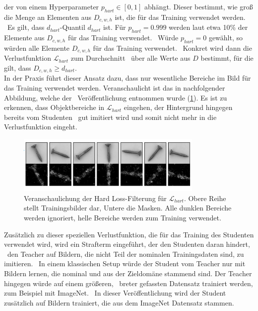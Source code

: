 der von einem Hyperparameter $p_{hart} \in \left[0,1\right]$ abhängt. Dieser bestimmt, wie groß die Menge an Elementen aus $D_{c,w,h}$ ist, die für das Training verwendet werden. \
Es gilt, dass $d_{hart}$-Quantil $d_{hart}$ ist. Für $p_{hart}=\num{0,999}$ werden laut \cite{efficientad} etwa 10\% der Elemente aus $D_{c,w,h}$ für das Training verwendet. \
Würde $p_{hart}=0$ gewählt, so würden alle Elemente $D_{c,w,h}$ für das Training verwendet. \ Konkret wird dann die Verlustfunktion $\mathcal{L}_{hart}$ zum Durchschnitt \
über alle Werte aus $D$ bestimmt, für die gilt, dass $D_{c,w,h} \geq d_{hart}$. \\
In der Praxis führt dieser Ansatz dazu, dass nur wesentliche Bereiche im Bild für das Training verwendet werden. Veranschaulicht ist das in nachfolgender Abbildung, welche der \
Veröffentlichung entnommen wurde (\ref{fig:hardthreshold}). Es ist zu erkennen, dass Objektbereiche in $\mathcal{L}_{hart}$ eingehen, der Hintergrund hingegen bereits vom Studenten \
gut imitiert wird und somit nicht mehr in die Verlustfunktion eingeht. \\
\begin{figure}[h]
    \centering
    \includegraphics[width=0.8\textwidth]{bilder/hardloss.png}
    \caption{Veranschaulichung der \glqq Hard Loss\grqq{}-Filterung für $\mathcal{L}_{hart}$. Obere Reihe stellt Trainingsbilder dar, Untere die Masken. Alle dunklen Bereiche werden ignoriert, helle Bereiche werden zum Training verwendet. \cite{efficientad}}
    \label{fig:hardthreshold}
\end{figure}
Zusätzlich zu dieser speziellen Verlustfunktion, die für das Training des Studenten verwendet wird, wird ein Strafterm eingeführt, der den Studenten daran hindert, \
den Teacher auf Bildern, die nicht Teil der nominalen Trainingsdaten sind, zu imitieren. \ 
In einem klassischen Setup würde der Student vom Teacher nur mit Bildern lernen, die nominal und aus der Zieldomäne stammend sind. Der Teacher hingegen würde auf einem größeren, \ 
breter gefassten Datensatz trainiert werden, zum Beispiel mit ImageNet. \ 
In dieser Veröffentlichung wird der Student zusätzlich auf Bildern trainiert, die aus dem ImageNet Datensatz stammen. \
